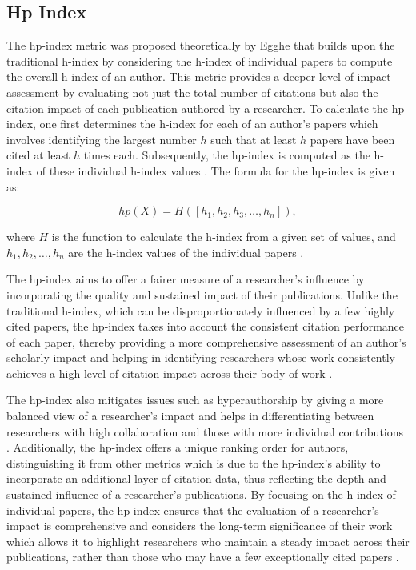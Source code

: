 \subsection{Hp Index}
The hp-index metric was proposed theoretically by Egghe \cite{egghe2011single}
that builds upon the traditional h-index by considering the h-index of
individual papers to compute the overall h-index of an author. This metric
provides a deeper level of impact assessment by evaluating not just the total
number of citations but also the citation impact of each publication authored
by a researcher. To calculate the hp-index, one first determines the h-index
for each of an author's papers which involves identifying the largest number
$h$ such that at least $h$ papers have been cited at least $h$ times each.
Subsequently, the hp-index is computed as the h-index of these individual
h-index values \cite{bihari2018,singhal2023analysis,egghe2011single}. The
formula for the hp-index is given as:

\[
    hp(X) = H([h_1, h_2, h_3, \ldots, h_n]),
\]

where $H$ is the function to calculate the h-index from a given set of values,
and $h_1, h_2, \ldots, h_n$ are the h-index values of the individual papers
\cite{egghe2011single}.

The hp-index aims to offer a fairer measure of a researcher's influence by
incorporating the quality and sustained impact of their publications. Unlike
the traditional h-index, which can be disproportionately influenced by a few
highly cited papers, the hp-index takes into account the consistent citation
performance of each paper, thereby providing a more comprehensive assessment of
an author’s scholarly impact and helping in identifying researchers whose work
consistently achieves a high level of citation impact across their body of work
\cite{singhal2023hp,singhal2023analysis}.

The hp-index also mitigates issues such as hyperauthorship by giving a more
balanced view of a researcher's impact and helps in differentiating between
researchers with high collaboration and those with more individual
contributions \cite{singhal2023hp,singhal2023analysis}. Additionally, the
hp-index offers a unique ranking order for authors, distinguishing it from
other metrics which is due to the hp-index's ability to incorporate an
additional layer of citation data, thus reflecting the depth and sustained
influence of a researcher's publications. By focusing on the h-index of
individual papers, the hp-index ensures that the evaluation of a researcher’s
impact is comprehensive and considers the long-term significance of their work
which allows it to highlight researchers who maintain a steady impact across
their publications, rather than those who may have a few exceptionally cited
papers \cite{singhal2023hp,singhal2023analysis}.

